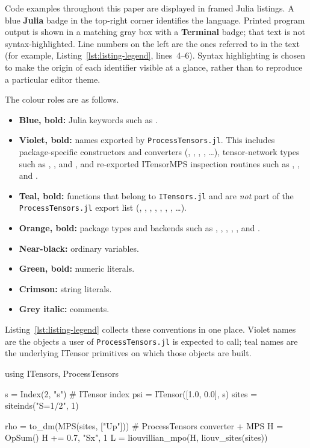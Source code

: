 
\label{app:code-listings}

Code examples throughout this paper are displayed in framed Julia listings.
A blue \textbf{Julia} badge in the top-right corner identifies the language.
Printed program output is shown in a matching gray box with a \textbf{Terminal} badge; that text is not syntax-highlighted.
Line numbers on the left are the ones referred to in the text (for example, Listing~\ref{lst:listing-legend}, lines~4--6).
Syntax highlighting is chosen to make the origin of each identifier visible at a glance, rather than to reproduce a particular editor theme.

The colour roles are as follows.
\begin{itemize}
    \item \textbf{Blue, bold:} Julia keywords such as .
    \item \textbf{Violet, bold:} names exported by \texttt{ProcessTensors.jl}.
    This includes package-specific constructors and converters (, , , , \ldots), tensor-network types such as , , and , and re-exported ITensorMPS inspection routines such as , , and .
    \item \textbf{Teal, bold:} functions that belong to \texttt{ITensors.jl} and are \emph{not} part of the \texttt{ProcessTensors.jl} export list (, , , , , , , \ldots).
    \item \textbf{Orange, bold:} package types and backends such as , , , , , and .
    \item \textbf{Near-black:} ordinary variables.
    \item \textbf{Green, bold:} numeric literals.
    \item \textbf{Crimson:} string literals.
    \item \textbf{Grey italic:} comments.
\end{itemize}

Listing~\ref{lst:listing-legend} collects these conventions in one place.
Violet names are the objects a user of \texttt{ProcessTensors.jl} is expected to call; teal names are the underlying ITensor primitives on which those objects are built.

%
\begin{juliacode}[
  caption={Colour legend for the listings in this paper.},
  label={lst:listing-legend},
]
using ITensors, ProcessTensors

s = Index(2, "s")                       # ITensor index
psi = ITensor([1.0, 0.0], s)
sites = siteinds("S=1/2", 1)

rho = to_dm(MPS(sites, ["Up"]))         # ProcessTensors converter + MPS
H = OpSum()
H += 0.7, "Sx", 1
L = liouvillian_mpo(H, liouv_sites(sites))
\end{juliacode}
%
